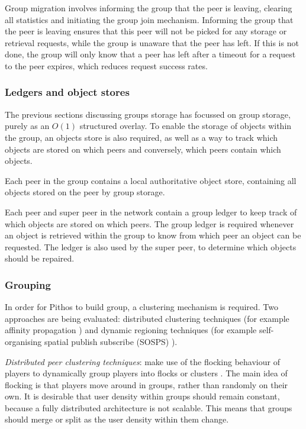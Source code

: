 Group migration involves informing the group that the peer is leaving, clearing all statistics and initiating the group join mechanism. Informing the group that the peer is leaving ensures that this peer will not be picked for any storage or retrieval requests, while the group is unaware that the peer has left. If this is not done, the group will only know that a peer has left after a timeout for a request to the peer expires, which reduces request success rates.

\subsubsection{Ledgers and object stores}

The previous sections discussing groups storage has focussed on group storage, purely as an $O(1)$ structured overlay. To enable the storage of objects within the group, an objects store is also required, as well as a way to track which objects are stored on which peers and conversely, which peers contain which objects.

Each peer in the group contains a local authoritative object store, containing all objects stored on the peer by group storage.

Each peer and super peer in the network contain a group ledger to keep track of which objects are stored on which peers. The group ledger is required whenever an object is retrieved within the group to know from which peer an object can be requested. The ledger is also used by the super peer, to determine which objects should be repaired.

\subsubsection{Grouping}

In order for Pithos to build group, a clustering mechanism is required. Two approaches are being evaluated: distributed clustering techniques (for example affinity propagation \cite{affinity_propagation}) and dynamic regioning techniques (for example self-organising spatial publish subscribe (SOSPS) \cite{self_organising_sps_post}).

\emph{Distributed peer clustering techniques}: make use of the flocking behaviour of players to dynamically group players into flocks or clusters \cite{flocking}. The main idea of flocking is that players move around in groups, rather than randomly on their own. It is desirable that user density within groups should remain constant, because a fully distributed architecture is not scalable. This means that groups should merge or split as the user density within them change.


